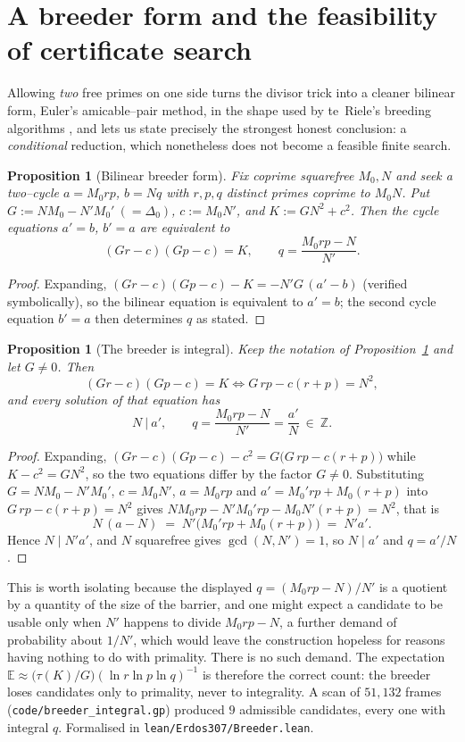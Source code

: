 \documentclass[11pt]{article}
\newtheorem{proposition}[theorem]{Proposition}
\theoremstyle{definition}
\begin{document}
\section{A breeder form and the feasibility of certificate search}\label{sec:breeder}

Allowing \emph{two} free primes on one side turns the divisor trick into a cleaner bilinear form,
Euler's amicable--pair method, in the shape used by te~Riele's breeding algorithms
\cite{teRiele1984}, and lets us state precisely the strongest honest conclusion: a
\emph{conditional} reduction, which nonetheless does not become a feasible finite search.

\begin{proposition}[Bilinear breeder form]\label{prop:bde}
Fix coprime squarefree $M_0,N$ and seek a two--cycle $a=M_0rp$, $b=Nq$ with $r,p,q$ distinct primes
coprime to $M_0N$. Put $G:=NM_0-N'M_0'\ (=\Delta_0)$, $c:=M_0N'$, and $K:=GN^2+c^2$. Then the cycle
equations $a'=b$, $b'=a$ are equivalent to
\[
(Gr-c)(Gp-c)=K, \qquad q=\frac{M_0rp-N}{N'}.
\]
\end{proposition}
\begin{proof}
Expanding, $(Gr-c)(Gp-c)-K=-N'G\,(a'-b)$ (verified symbolically), so the bilinear equation is
equivalent to $a'=b$; the second cycle equation $b'=a$ then determines $q$ as stated.
\end{proof}

\begin{proposition}[The breeder is integral]\label{prop:bdeint}
Keep the notation of Proposition~\textup{\ref{prop:bde}} and let $G\ne0$. Then
\[ (Gr-c)(Gp-c)=K \iff G\,rp-c(r+p)=N^{2}, \]
and every solution of that equation has
\[ N\ \big|\ a', \qquad q=\frac{M_0rp-N}{N'}=\frac{a'}{N}\ \in\ \mathbb{Z}. \]
\end{proposition}
\begin{proof}
Expanding, $(Gr-c)(Gp-c)-c^{2}=G\bigl(G\,rp-c(r+p)\bigr)$ while $K-c^{2}=GN^{2}$, so the two
equations differ by the factor $G\ne0$. Substituting $G=NM_0-N'M_0'$, $c=M_0N'$, $a=M_0rp$ and
$a'=M_0'rp+M_0(r+p)$ into $G\,rp-c(r+p)=N^{2}$ gives
$NM_0rp-N'M_0'rp-M_0N'(r+p)=N^{2}$, that is
\[ N\,(a-N)\;=\;N'\bigl(M_0'rp+M_0(r+p)\bigr)\;=\;N'a'. \]
Hence $N\mid N'a'$, and $N$ squarefree gives $\gcd(N,N')=1$, so $N\mid a'$ and $q=a'/N$.
\end{proof}

This is worth isolating because the displayed $q=(M_0rp-N)/N'$ is a quotient by a quantity of the
size of the barrier, and one might expect a candidate to be usable only when $N'$ happens to divide
$M_0rp-N$, a further demand of probability about $1/N'$, which would leave the construction
hopeless for reasons having nothing to do with primality. There is no such demand. The expectation
$\mathbb{E}\approx\bigl(\tau(K)/G\bigr)(\ln r\ln p\ln q)^{-1}$ is therefore the correct count: the
breeder loses candidates only to primality, never to integrality. A scan of $51{,}132$ frames
(\texttt{code/breeder\_integral.gp}) produced $9$ admissible candidates, every one with integral $q$.
Formalised in \texttt{lean/Erdos307/Breeder.lean}.
\end{document}
